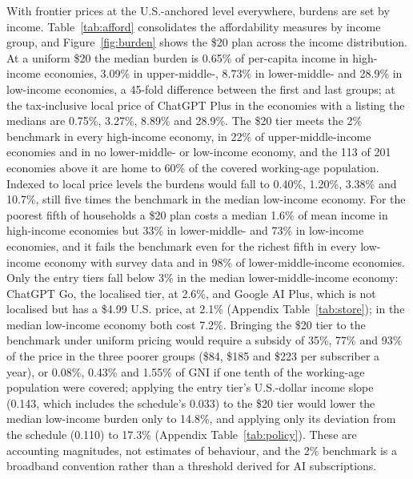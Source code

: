 \documentclass[11pt]{article}
\theoremstyle{definition}
\theoremstyle{remark}
\begin{document}
With frontier prices at the U.S.-anchored level everywhere, burdens are set by income. Table~\ref{tab:afford} consolidates the affordability measures by income group, and Figure~\ref{fig:burden} shows the \$20 plan across the income distribution. At a uniform \$20 the median burden is 0.65\% of per-capita income in high-income economies, 3.09\% in upper-middle-, 8.73\% in lower-middle- and 28.9\% in low-income economies, a 45-fold difference between the first and last groups; at the tax-inclusive local price of ChatGPT Plus in the economies with a listing the medians are 0.75\%, 3.27\%, 8.89\% and 28.9\%. The \$20 tier meets the 2\% benchmark in every high-income economy, in 22\% of upper-middle-income economies and in no lower-middle- or low-income economy, and the 113 of 201 economies above it are home to 60\% of the covered working-age population. Indexed to local price levels the burdens would fall to 0.40\%, 1.20\%, 3.38\% and 10.7\%, still five times the benchmark in the median low-income economy. For the poorest fifth of households a \$20 plan costs a median 1.6\% of mean income in high-income economies but 33\% in lower-middle- and 73\% in low-income economies, and it fails the benchmark even for the richest fifth in every low-income economy with survey data and in 98\% of lower-middle-income economies. Only the entry tiers fall below 3\% in the median lower-middle-income economy: ChatGPT Go, the localised tier, at 2.6\%, and Google AI Plus, which is not localised but has a \$4.99 U.S. price, at 2.1\% (Appendix Table~\ref{tab:store}); in the median low-income economy both cost 7.2\%. Bringing the \$20 tier to the benchmark under uniform pricing would require a subsidy of 35\%, 77\% and 93\% of the price in the three poorer groups (\$84, \$185 and \$223 per subscriber a year), or 0.08\%, 0.43\% and 1.55\% of GNI if one tenth of the working-age population were covered; applying the entry tier's U.S.-dollar income slope (0.143, which includes the schedule's 0.033) to the \$20 tier would lower the median low-income burden only to 14.8\%, and applying only its deviation from the schedule (0.110) to 17.3\% (Appendix Table~\ref{tab:policy}). These are accounting magnitudes, not estimates of behaviour, and the 2\% benchmark is a broadband convention rather than a threshold derived for AI subscriptions.
\end{document}
